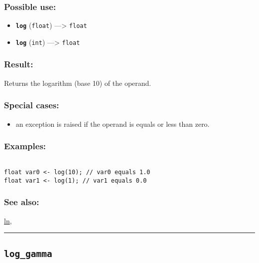 \documentclass[]{book}
\providecommand{\tightlist}{%
  \setlength{\itemsep}{0pt}\setlength{\parskip}{0pt}}
\theoremstyle{definition}
\theoremstyle{definition}
\theoremstyle{definition}
\theoremstyle{remark}
\begin{document}
\subsubsection{Possible use:}\label{possible-use-329}

\begin{itemize}
\tightlist
\item
  \textbf{\texttt{log}} (\texttt{float}) ---\textgreater{}
  \texttt{float}
\item
  \textbf{\texttt{log}} (\texttt{int}) ---\textgreater{} \texttt{float}
\end{itemize}

\subsubsection{Result:}\label{result-319}

Returns the logarithm (base 10) of the operand.

\subsubsection{Special cases:}\label{special-cases-92}

\begin{itemize}
\tightlist
\item
  an exception is raised if the operand is equals or less than zero.
\end{itemize}

\subsubsection{Examples:}\label{examples-228}

\begin{verbatim}
 
float var0 <- log(10); // var0 equals 1.0 
float var1 <- log(1); // var1 equals 0.0
\end{verbatim}

\subsubsection{See also:}\label{see-also-129}

\href{OperatorsIM\#ln}{ln},

\begin{center}\rule{0.5\linewidth}{\linethickness}\end{center}

\subsection{\texorpdfstring{\texttt{log\_gamma}}{log\_gamma}}\label{log_gamma}
\end{document}
